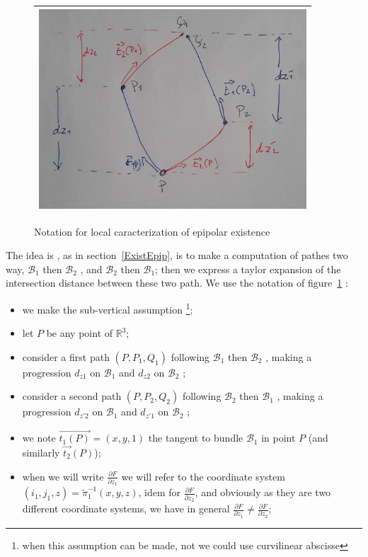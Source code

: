 \documentclass[a4paper]{article}
\newcommand{\RR}{\ensuremath{\mathbb{R}}}
\newcommand{\Bund}[1]{\ensuremath{\mathcal{B}_{#1}}}
\newcommand{\BundO}{\Bund{1}}
\newcommand{\BundT}{\Bund{2}}
\newcommand{\PiVert}{\widetilde{\pi}}
\newcommand{\DerPart}[2]{\frac{\partial #1}{\partial #2}}
\begin{document}
\begin{figure}
\centering
\begin{tabular}{||c||}
 \hline \hline
\includegraphics[width=10cm]{FIGS/EquadifEpip.jpg}
 \\ \hline \hline
\end{tabular}
\caption{Notation for local caracterization of epipolar existence}
\label{EqDifEpip}
\end{figure}

The idea is , as in section~\ref{ExistEpip}, is to make a  computation of pathes two way, $\BundO$ then $\BundT$ ,
and $\BundT$ then $\BundO$; then we express a taylor expansion of the intersection distance
between these two path.  We use the notation of figure~\ref{EqDifEpip} :

\begin{itemize}
   \item we make the sub-vertical assumption \footnote{when this assumption can be made,
          not we could use curvilinear abscisse};
   \item let $P$ be any point of $\RR^3$;
   \item consider a first path $(P,P_1,Q_1)$ following  $\BundO$ then $\BundT$ , making a
         progression $d_{z1}$ on $\BundO$ and  $d_{z2}$ on $\BundT$ ;
   \item consider a second path $(P,P_2,Q_2)$ following  $\BundT$ then $\BundO$ , making a
         progression $d_{z'2}$ on $\BundO$ and  $d_{z'1}$ on $\BundT$ ;
   \item we note $\overrightarrow{t_1(P)}=(x,y,1)$ the tangent to bundle  $\BundO$  in point $P$
         (and similarly $\overrightarrow{t_2}(P)$);
   \item when we will write  $\DerPart{F}{z_1}$ we will refer to the coordinate system $(i_1,j_1,z) = \PiVert_1^{-1}(x,y,z)$,
         idem for  $\DerPart{F}{z_2}$, and obviously as they are two different coordinate systems, we have in general
        $\DerPart{F}{z_1}  \neq \DerPart{F}{z_2}$;
\end{itemize}
\end{document}
